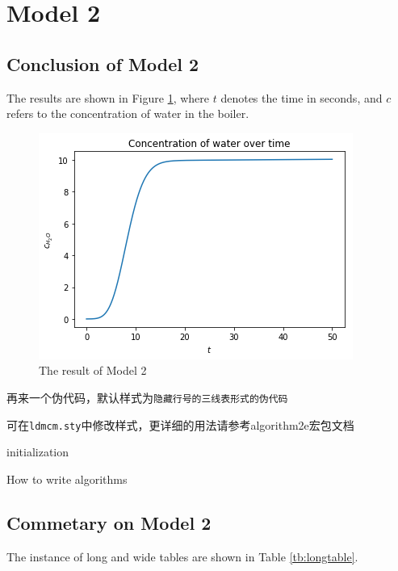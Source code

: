 \documentclass[12pt]{ctexart}
\begin{document}
\section{Model 2}
\subsection{Conclusion of Model 2}
The results are shown in Figure \ref{fig:result}, where $t$ denotes the time in seconds, and $c$ refers to the concentration of water in the boiler.

\begin{figure}[!ht]%
	\centering
	\includegraphics[width=.5\textwidth]{water.png}
	\caption{The result of Model 2}\label{fig:result}
\end{figure}%

再来一个伪代码，默认样式为\texttt{隐藏行号的三线表形式的伪代码}

可在\verb|ldmcm.sty|中修改样式，更详细的用法请参考algorithm2e宏包文档

\begin{algorithm}[H]
	initialization\;
	\caption{How to write algorithms}
\end{algorithm}


\clearpage
\subsection{Commetary on Model 2}
The instance of long and wide tables are shown in Table \ref{tb:longtable}.
\end{document}
